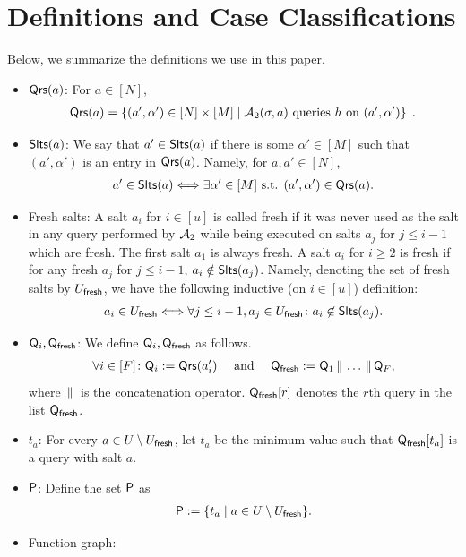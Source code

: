 \section{Definitions and Case Classifications}\label{app:def}
Below, we summarize the definitions we use in this paper.
\begin{itemize}
\item $\mathsf{Qrs}(a)$: For $a\in [N]$,
\begin{align*}
\mathsf{Qrs}(a) = \left\{ (a',\alpha') \in [N]\times [M] \mid \mathcal{A}_2(\sigma,a) \text{  queries $h$ on   $(a',\alpha')$}\right\}\;.
\end{align*}
\item $\mathsf{Slts}(a)$: We say that $a'\in \mathsf{Slts}(a)$ if there is some $\alpha'\in [M]$ such that $(a',\alpha')$ is an entry in $\mathsf{Qrs}(a)$. Namely, for $a,a'\in [N]$, 
\begin{align*}
a'\in \mathsf{Slts}(a) \Longleftrightarrow \exists \alpha' \in [M] \text{ s.t. } (a',\alpha') \in \mathsf{Qrs}(a).
\end{align*}
\item Fresh salts: A salt $a_i$ for $i \in [u]$ is called fresh if it was never used as the salt in any query performed by $\mathcal{A}_2$ while being executed on salts $a_j$ for $j\le i-1$ which are fresh. The first salt $a_1$ is always fresh. A salt $a_i$ for $i \ge 2$ is fresh if for any fresh $a_j$ for $j \le i-1$, $a_i \notin \mathsf{Slts}(a_j)$. Namely, denoting the set of fresh salts by $U_\textsf{fresh}$, we have the following inductive (on $i\in [u]$) definition:
 \begin{align*}
a_i\in U_\textsf{fresh} \Longleftrightarrow \forall j\le i-1,  a_j \in U_\textsf{fresh}\colon a_i \not \in \mathsf{Slts}(a_j).  
\end{align*}
\item $\mathsf{Q}_i,\mathsf{Q}_\textsf{fresh}$: We define $\mathsf{Q}_i,\mathsf{Q}_\textsf{fresh}$ as follows.
\begin{align*}
 \forall i\in [F]\colon \mathsf{Q}_i:=\mathsf{Qrs}(a_i') \quad \text{ and } \quad \mathsf{Q}_\textsf{fresh}:=\mathsf{Q}_1\,\|\,\ldots\,\|\, \mathsf{Q}_F,
 \end{align*}
 where $\,\|\,$ is the concatenation operator. $\mathsf{Q}_\textsf{fresh}[r]$ denotes the $r$th query in the list $\mathsf{Q}_\textsf{fresh}$.
 \item $t_a$: 
 For every $a\in U\setminus U_\textsf{fresh}$, let $t_a$ be the minimum value such that $\mathsf{Q}_\textsf{fresh}[t_a]$ is a query with salt $a$. 
 \item $\mathsf{P}$: 
 Define the set $\mathsf{P}$ as 
 \begin{align*}
 \mathsf{P}:=\{t_a\mid a\in U\setminus U_\textsf{fresh}\}.
 \end{align*}
\item Function graph:

\end{itemize}
